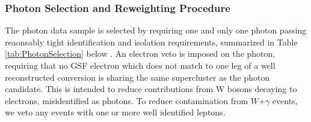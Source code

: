 \subsubsection{Photon Selection and Reweighting Procedure}
The photon data sample is selected by requiring one and only one photon passing reaonsably tight
identification and isolation requirements, summarized in Table \ref{tab:PhotonSelection} below 
\cite{MITHggNote}. 
An electron veto is imposed on the photon, requiring that no GSF electron which does not match to 
one leg of a well reconstructed conversion is sharing the same supercluster as the photon
candidate. This is intended to reduce contributions from W bosons decaying to electrons, misidentified
as photons. To reduce contamination from $W$+$\gamma$ events, we veto any events with one or 
more well identified leptons.


